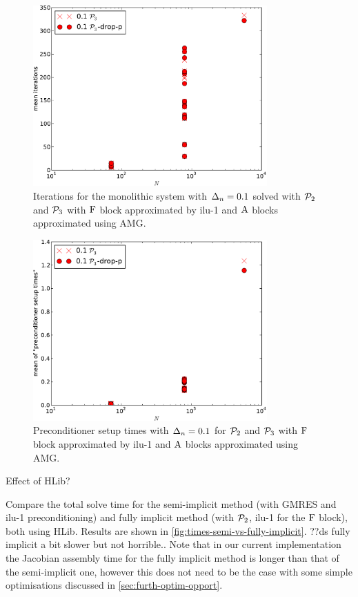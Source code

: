 \begin{figure}
  \centering
  \includegraphics[width=0.8\textwidth]{plots/linear_solvers_p2p3/implicitilu-1-meanofnsolveritersvsinitialnnode.pdf}
  \caption{Iterations for the monolithic system with $\Delta_{n}=0.1$ solved with $\mathcal{P}_2$ and $\mathcal{P}_3$ with $\mathrm{F}$ block approximated by ilu-1 and $\mathrm{A}$ blocks approximated using AMG.}
  \label{fig:its-p23-ilu1}
\end{figure}

\begin{figure}
  \centering
  \includegraphics[width=0.8\textwidth]{plots/linear_solvers_p2p3/implicitilu-1-meanofpreconditionersetuptimesvsinitialnnode.pdf}
  \caption{Preconditioner setup times with $\Delta_{n}=0.1$ for $\mathcal{P}_2$ and $\mathcal{P}_3$ with $\mathrm{F}$ block approximated by ilu-1 and $\mathrm{A}$ blocks approximated using AMG.}
  \label{fig:times-p23-ilu1}
\end{figure}

Effect of HLib?

Compare the total solve time for the semi-implicit method (with GMRES and ilu-1 preconditioning) and fully implicit method (with $\mathcal{P}_2$, ilu-1 for the $\mathrm{F}$ block), both using HLib.
Results are shown in \cref{fig:times-semi-vs-fully-implicit}.
??ds fully implicit a bit slower but not horrible..
Note that in our current implementation the Jacobian assembly time for the fully implicit method is longer than that of the semi-implicit one, however this does not need to be the case with some simple optimisations discussed in \cref{sec:furth-optim-opport}.

